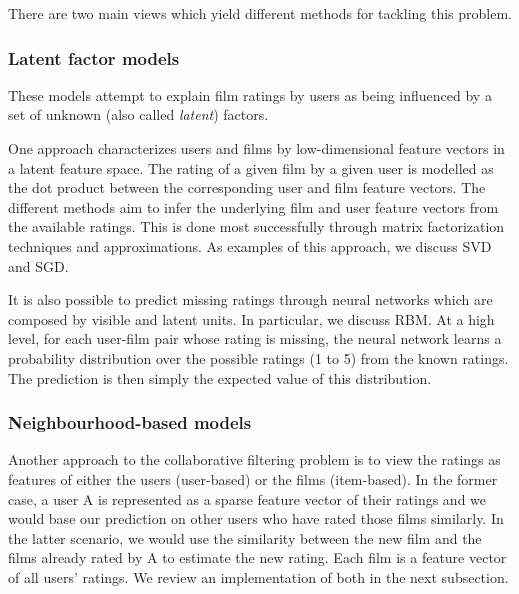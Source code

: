 \documentclass[10pt,conference,compsocconf]{IEEEtran}
\begin{document}
There are two main views which yield different methods for tackling this problem.

\subsubsection*{\textbf{Latent factor models}} 

%
%

These models attempt to explain film ratings by users as being influenced by a set of unknown (also called \emph{latent}) factors.

One approach characterizes users and films by low-dimensional feature vectors in a latent feature space. The rating of a given film by a given user is modelled as the dot product between the corresponding user and film feature vectors. The different methods aim to infer the underlying film and user feature vectors from the available ratings. This is done most successfully through matrix factorization techniques and approximations. As examples of this approach, we discuss SVD and SGD.

It is also possible to predict missing ratings through neural networks which are composed by visible and latent units. In particular, we discuss RBM. At a high level, for each user-film pair whose rating is missing, the neural network learns a probability distribution over the possible ratings (1 to 5) from the known ratings. The prediction is then simply the expected value of this distribution.


\subsubsection*{\textbf{Neighbourhood-based models}} Another approach to the collaborative filtering problem is to view the ratings as features of either the users (user-based) or the films (item-based). In the former case, a user A is represented as a sparse feature vector of their ratings and we would base our prediction on other users who have rated those films similarly. In the latter scenario, we would use the similarity between the new film and the films already rated by A to estimate the new rating. Each film is a feature vector of all users' ratings. We review an implementation of both in the next subsection.
\end{document}
